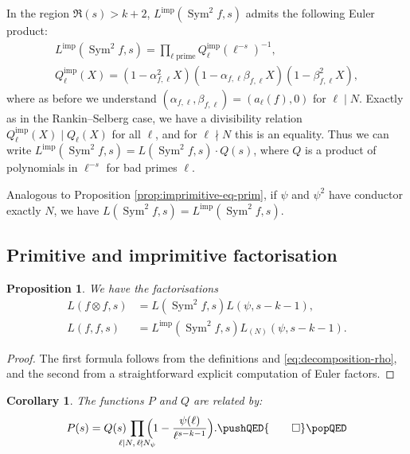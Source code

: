 \documentclass[11pt, a4paper, reqno]{amsart}
\theoremstyle{definition}
\theoremstyle{plain}
\newtheorem{proposition}[definition]{Proposition}
\newtheorem{corollary}[definition]{Corollary}
\theoremstyle{remark}
\DeclareMathOperator{\Sym}{Sym}
\newcommand{\Limp}{L^{\mathrm{imp}}}
\newcommand{\myqed}{\pushQED{\qed} \qedhere \popQED}
\begin{document}
  In the region $\Re(s) > k + 2$, $\Limp(\Sym^2 f,s)$ admits the following Euler product:
  \begin{gather*}
   \Limp(\Sym^2 f,s) = \prod_{\ell \; \text{prime}} Q_\ell^{\mathrm{imp}}(\ell^{-s})^{-1}, \\
   Q_\ell^{\mathrm{imp}}(X) = (1-\alpha_{f,\ell}^2 X)(1-\alpha_{f,\ell}\beta_{f,\ell}X)(1-\beta_{f,\ell}^2 X),
  \end{gather*}
  where as before we understand $(\alpha_{f,\ell},\beta_{f,\ell}) = (a_\ell(f),0)$ for $\ell \mid N$. Exactly as in the Rankin--Selberg case, we have a divisibility relation $Q_\ell^{\mathrm{imp}}(X) \mid Q_\ell(X)$ for all $\ell$, and for $\ell \nmid N$ this is an equality. Thus we can write $\Limp(\Sym^2 f,s) = L(\Sym^2 f,s)\cdot Q(s)$, where $Q$ is a product of polynomials in $\ell^{-s}$ for bad primes $\ell$.

  Analogous to Proposition \ref{prop:imprimitive-eq-prim}, if $\psi$ and $\psi^2$ have conductor exactly $N$, we have $L(\Sym^2 f, s) = \Limp(\Sym^2 f, s)$.

 \subsection{Primitive and imprimitive factorisation}

  \begin{proposition}
   We have the factorisations
   \begin{subequations}
    \begin{align}
     L(f \otimes f,s) &= L(\Sym^2 f,s)L(\psi, s - k - 1), \label{eq:complex-factorization-l} \\
     L(f,f,s) &= \Limp(\Sym^2 f,s)L_{(N)}(\psi,s-k-1) \label{eq:imprimitive-factorization-l}.
    \end{align}
   \end{subequations}
  \end{proposition}

  \begin{proof}
   The first formula follows from the definitions and \eqref{eq:decomposition-rho}, and the second from a straightforward explicit computation of Euler factors.
  \end{proof}

  \begin{corollary}
   \label{cor:defect-terms}
   The functions $P$ and $Q$ are related by:
   \[
    P(s) = Q(s)\, \prod_{\mathclap{\ell \mid N,\, \ell \nmid N_{\psi}}}\, \Bigl(1 - \frac{\psi(\ell)}{\ell^{s-k-1}} \Bigr).\myqed
   \]
  \end{corollary}
\end{document}
